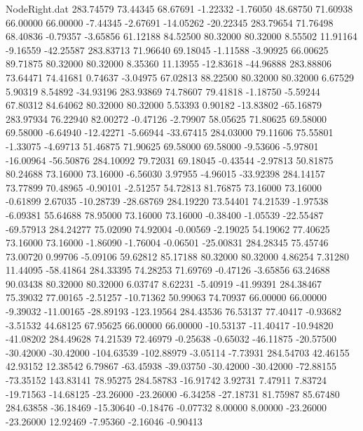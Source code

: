 \begin{filecontents}{NodeRight.dat}
 283.74579   73.44345   68.67691    -1.22332   -1.76050   48.68750   71.60938   66.00000   66.00000   -7.44345   -2.67691  -14.05262  -20.22345
 283.79654   71.76498   68.40836    -0.79357   -3.65856   61.12188   84.52500   80.32000   80.32000    8.55502   11.91164   -9.16559  -42.25587
 283.83713   71.96640   69.18045    -1.11588   -3.90925   66.00625   89.71875   80.32000   80.32000    8.35360   11.13955  -12.83618  -44.96888
 283.88806   73.64471   74.41681     0.74637   -3.04975   67.02813   88.22500   80.32000   80.32000    6.67529    5.90319    8.54892  -34.93196
 283.93869   74.78607   79.41818    -1.18750   -5.59244   67.80312   84.64062   80.32000   80.32000    5.53393    0.90182  -13.83802  -65.16879
 283.97934   76.22940   82.00272    -0.47126   -2.79907   58.05625   71.80625   69.58000   69.58000   -6.64940  -12.42271   -5.66944  -33.67415
 284.03000   79.11606   75.55801    -1.33075   -4.69713   51.46875   71.90625   69.58000   69.58000   -9.53606   -5.97801  -16.00964  -56.50876
 284.10092   79.72031   69.18045    -0.43544   -2.97813   50.81875   80.24688   73.16000   73.16000   -6.56030    3.97955   -4.96015  -33.92398
 284.14157   73.77899   70.48965    -0.90101   -2.51257   54.72813   81.76875   73.16000   73.16000   -0.61899    2.67035  -10.28739  -28.68769
 284.19220   73.54401   74.21539    -1.97538   -6.09381   55.64688   78.95000   73.16000   73.16000   -0.38400   -1.05539  -22.55487  -69.57913
 284.24277   75.02090   74.92004    -0.00569   -2.19025   54.19062   77.40625   73.16000   73.16000   -1.86090   -1.76004   -0.06501  -25.00831
 284.28345   75.45746   73.00720     0.99706   -5.09106   59.62812   85.17188   80.32000   80.32000    4.86254    7.31280   11.44095  -58.41864
 284.33395   74.28253   71.69769    -0.47126   -3.65856   63.24688   90.03438   80.32000   80.32000    6.03747    8.62231   -5.40919  -41.99391
 284.38467   75.39032   77.00165    -2.51257  -10.71362   50.99063   74.70937   66.00000   66.00000   -9.39032  -11.00165  -28.89193 -123.19564
 284.43536   76.53137   77.40417    -0.93682   -3.51532   44.68125   67.95625   66.00000   66.00000  -10.53137  -11.40417  -10.94820  -41.08202
 284.49628   74.21539   72.46979    -0.25638   -0.65032  -46.11875  -20.57500  -30.42000  -30.42000 -104.63539 -102.88979   -3.05114   -7.73931
 284.54703   42.46155   42.93152    12.38542    6.79867  -63.45938  -39.03750  -30.42000  -30.42000  -72.88155  -73.35152  143.83141   78.95275
 284.58783  -16.91742    3.92731     7.47911    7.83724  -19.71563  -14.68125  -23.26000  -23.26000   -6.34258  -27.18731   81.75987   85.67480
 284.63858  -36.18469  -15.30640    -0.18476   -0.07732    8.00000    8.00000  -23.26000  -23.26000   12.92469   -7.95360   -2.16046   -0.90413

\end{filecontents}
